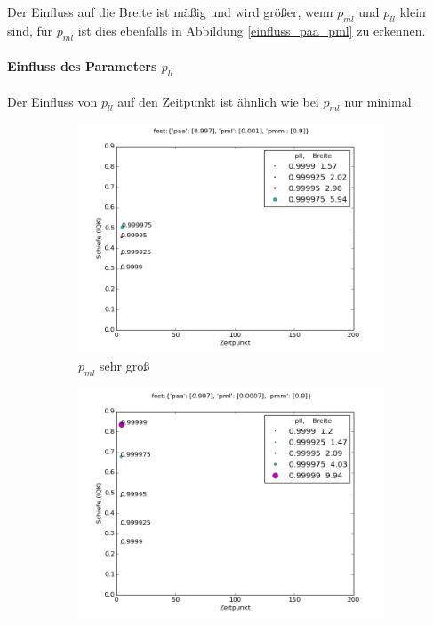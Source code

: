 Der Einfluss auf die Breite ist mäßig und wird größer, wenn $p_{ml}$ und $p_{ll}$ klein sind, für $p_{ml}$ ist dies ebenfalls in Abbildung \ref{einfluss_paa_pml} zu erkennen.


\paragraph*{Einfluss des Parameters $p_{ll}$}

Der Einfluss von $p_{ll}$ auf den Zeitpunkt ist ähnlich wie bei $p_{ml}$ nur minimal.

\begin{figure}[h]
\begin{subfigure}[t]{0.49\textwidth}
\includegraphics[width=\textwidth]{bilder/pll/3fest_09_0001_0997_p}
\caption{$p_{ml}$ sehr groß}
\label{einfluss_pll_pml++}
\end{subfigure}
\begin{subfigure}[t]{0.49\textwidth}
\includegraphics[width=\textwidth]{bilder/pll/3fest_09_00007_0997_p}

\end{subfigure}
\end{figure}

